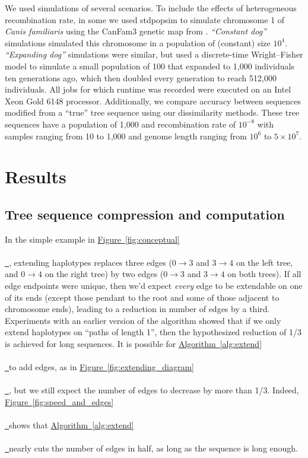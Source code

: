 \documentclass[10pt,twoside,lineno]{gsajnl}
\newcommand{\algorithmref}[2][]{%
	\hyperref[{#2}]{%
		Algorithm~\ref*{#2}%
		\ifx\\#1\\%
		\else
		\,#1%
		\fi
	}%
}
\newcommand*{\figref}[2][]{%
	\hyperref[{#2}]{%
		Figure~\ref*{#2}%
		\ifx\\#1\\%
		\else
		\,#1%
		\fi
	}%
}
\begin{document}
We used simulations of several scenarios.
To include the effects of heterogeneous recombination rate,
in some we used stdpopsim \citep{adrion2020stdpopsim} 
to simulate chromosome 1 of \textit{Canis familiaris}
using the CanFam3 genetic map from \citet{campbell2016}.
\emph{``Constant dog''} simulations simulated this chromosome in a 
population of (constant) size $10^4$.
\emph{``Expanding dog''} simulations were similar, but
used a discrete-time Wright--Fisher model to simulate
a small population of 100 that expanded to 1,000 individuals ten generations ago,
which then doubled every generation to reach 512,000 individuals.
All jobs for which runtime was recorded were executed on an Intel Xeon Gold 6148 processor.
 Additionally, we compare accuracy between sequences modified from a ``true'' tree sequence
 using our dissimilarity methods. 
 These tree sequences have a population of 1,000 and recombination rate of $10^{-8}$ with samples ranging from 10 to 1,000 and genome length ranging from $10^6$ to $5\times 10^7$.


\section{Results}

\subsection{Tree sequence compression and computation}


In the simple example in \figref{fig:conceptual},
extending haplotypes replaces three edges
($0 \to 3$ and $3 \to 4$ on the left tree, and $0 \to 4$ on the right tree)
by two edges ($0 \to 3$ and $3 \to 4$ on both trees).
If all edge endpoints were unique, then we'd expect \emph{every} edge to be extendable
on one of its ends
(except those pendant to the root and some of those adjacent to chromosome ends),
leading to a reduction in number of edges by a third.
Experiments with an earlier version of the algorithm showed that
if we only extend haplotypes on ``paths of length 1'', 
then the hypothesized reduction of 1/3 is achieved for long sequences.
It is possible for \algorithmref{alg:extend} to add edges, as in \figref{fig:extending_diagram},
but we still expect the number of edges to decrease by more than 1/3.
Indeed,
\figref{fig:speed_and_edges} shows that \algorithmref{alg:extend} nearly cuts the number of edges
in half, as long as the sequence is long enough.
\end{document}
